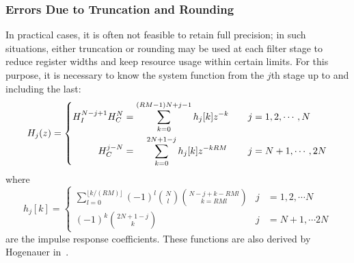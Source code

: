 \subsubsection{Errors Due to Truncation and Rounding}
\label{subsubsec:cic:truncation_and_rounding}

In practical cases, it is often not feasible to retain full precision; in such
situations, either truncation or rounding may  be used at each filter stage to
reduce register widths and keep resource usage within certain limits. For this
purpose, it is necessary  to know the system function from  the $j$th stage up
to and including the last:
\begin{equation}
    \label{eq:cic:truncation_rounding:system_function}
    H_j(z) = \left\lbrace
        \begin{aligned}
            H_I^{N-j+1}H_C^N                        &
            = \sum_{k=0}^{(RM-1)N+j-1} h_j[k]z^{-k} &
            \quad j                                 &
            = 1, 2, \cdots, N                       \\
            H_C^{j-N}                                          &
            = \hspace{1.1em}\sum_{k=0}^{2N+1-j} h_j[k]z^{-kRM} &
            \quad j                                            &
            = N+1, \cdots, 2N
        \end{aligned}
    \right.
\end{equation}
where
\begin{equation}
    \label{eq:cic:truncation_rounding:system_function}
    h_j[k] = \left\lbrace
        \begin{aligned}
            \sum_{l=0}^{\lfloor k/(RM) \rfloor} (-1)^l 
            {{N}\choose{l}}{{N-j+k-RMl}\choose{k = RMl}} &
            j                                            &
            = 1, 2, \cdots N                             \\
            (-1)^k{{2N+1-j}\choose{k}} &
            j                          &
            = N+1, \cdots 2N
        \end{aligned}
    \right.
\end{equation}
are the  impulse response  coefficients. These functions  are also  derived by
Hogenauer in~\cite{1163535}.


